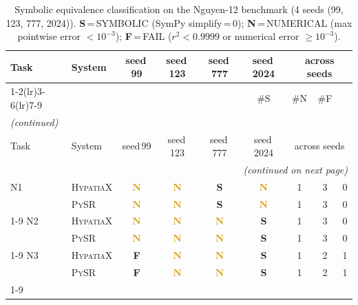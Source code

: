 \newcommand{\symT}{\textcolor{OliveGreen}{\bfseries S}}
\newcommand{\numT}{\textcolor{Goldenrod}{\bfseries N}}
\newcommand{\failT}{\textcolor{BrickRed}{\bfseries F}}

\begin{longtable}{llccccccc}
\caption{Symbolic equivalence classification on the Nguyen-12 benchmark
  (4 seeds (99, 123, 777, 2024)).
  \textbf{S}\,=\,SYMBOLIC (SymPy simplify\,=\,0);
  \textbf{N}\,=\,NUMERICAL (max pointwise error $<10^{-3}$);
  \textbf{F}\,=\,FAIL ($r^2 < 0.9999$ or numerical error $\ge 10^{-3}$).}
\label{tab:nguyen12_symequiv}\\
\toprule
\multicolumn{1}{l}{Task} & \multicolumn{1}{l}{System} & \multicolumn{1}{c}{\scriptsize seed\,99} & \multicolumn{1}{c}{\scriptsize seed\,123} & \multicolumn{1}{c}{\scriptsize seed\,777} & \multicolumn{1}{c}{\scriptsize seed\,2024} & \multicolumn{3}{c}{\scriptsize across seeds} \\
\cmidrule(lr){1-2}\cmidrule(lr){3-6}\cmidrule(lr){7-9}
 &  &  &  &  & {\scriptsize\#S} & {\scriptsize\#N} & {\scriptsize\#F} \\
\midrule
\endfirsthead
\multicolumn{9}{l}{\small\itshape (continued)} \\
\toprule
\multicolumn{1}{l}{Task} & \multicolumn{1}{l}{System} & \multicolumn{1}{c}{\scriptsize seed\,99} & \multicolumn{1}{c}{\scriptsize seed\,123} & \multicolumn{1}{c}{\scriptsize seed\,777} & \multicolumn{1}{c}{\scriptsize seed\,2024} & \multicolumn{3}{c}{\scriptsize across seeds} \\
\midrule
\endhead
\midrule
\multicolumn{9}{r}{\small\itshape (continued on next page)} \\
\endfoot
\bottomrule
\endlastfoot
N1 & \textsc{HypatiaX} & \numT & \numT & \symT & \numT & 1 & 3 & 0 \\
 & \textsc{PySR} & \numT & \numT & \symT & \numT & 1 & 3 & 0 \\
\cmidrule(lr){1-9}
N2 & \textsc{HypatiaX} & \numT & \numT & \numT & \symT & 1 & 3 & 0 \\
 & \textsc{PySR} & \numT & \numT & \numT & \symT & 1 & 3 & 0 \\
\cmidrule(lr){1-9}
N3 & \textsc{HypatiaX} & \failT & \numT & \numT & \symT & 1 & 2 & 1 \\
 & \textsc{PySR} & \failT & \numT & \numT & \symT & 1 & 2 & 1 \\
\cmidrule(lr){1-9}

\end{longtable}
